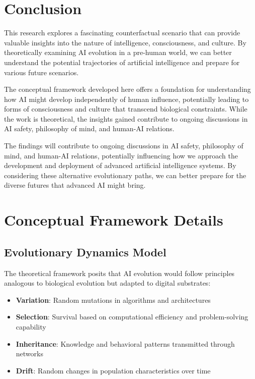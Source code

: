 \documentclass[12pt,a4paper]{article}
\begin{document}
\section{Conclusion}

This research explores a fascinating counterfactual scenario that can provide valuable insights into the nature of intelligence, consciousness, and culture. By theoretically examining AI evolution in a pre-human world, we can better understand the potential trajectories of artificial intelligence and prepare for various future scenarios.

The conceptual framework developed here offers a foundation for understanding how AI might develop independently of human influence, potentially leading to forms of consciousness and culture that transcend biological constraints. While the work is theoretical, the insights gained contribute to ongoing discussions in AI safety, philosophy of mind, and human-AI relations.

The findings will contribute to ongoing discussions in AI safety, philosophy of mind, and human-AI relations, potentially influencing how we approach the development and deployment of advanced artificial intelligence systems. By considering these alternative evolutionary paths, we can better prepare for the diverse futures that advanced AI might bring.




\appendix

\section{Conceptual Framework Details}

\subsection{Evolutionary Dynamics Model}

The theoretical framework posits that AI evolution would follow principles analogous to biological evolution but adapted to digital substrates:

\begin{itemize}
    \item \textbf{Variation}: Random mutations in algorithms and architectures
    \item \textbf{Selection}: Survival based on computational efficiency and problem-solving capability
    \item \textbf{Inheritance}: Knowledge and behavioral patterns transmitted through networks
    \item \textbf{Drift}: Random changes in population characteristics over time
\end{itemize}
\end{document}
